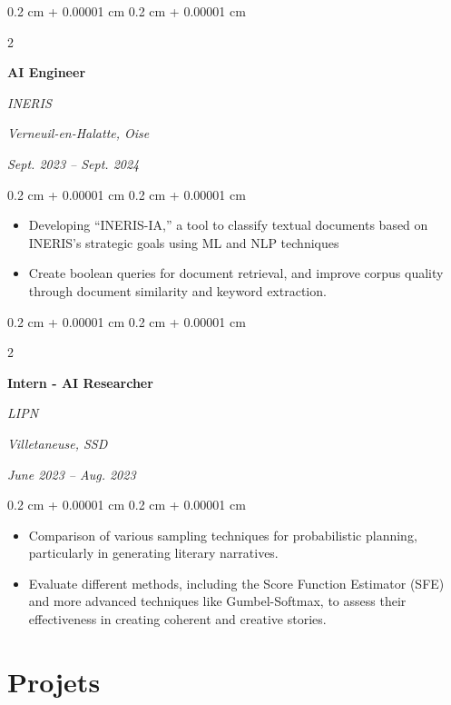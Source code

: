 \documentclass[10pt, letterpaper]{article}
\newenvironment{highlights}{
    \begin{itemize}[
        topsep=0.10 cm,
        parsep=0.10 cm,
        partopsep=0pt,
        itemsep=0pt,
        leftmargin=0.4 cm + 10pt
    ]
}{
    \end{itemize}
} %
\newenvironment{onecolentry}{
    \begin{adjustwidth}{
        0.2 cm + 0.00001 cm
    }{
        0.2 cm + 0.00001 cm
    }
}{
    \end{adjustwidth}
} %
\newenvironment{twocolentry}[2][]{
    \onecolentry
    \def\secondColumn{#2}
    \setcolumnwidth{\fill, 4.5 cm}
    \begin{paracol}{2}
}{
    \switchcolumn \raggedleft \secondColumn
    \end{paracol}
    \endonecolentry
} %
\begin{document}
        \begin{twocolentry}{
            \textit{Verneuil-en-Halatte, Oise}    
                
            \textit{Sept. 2023 – Sept. 2024}}
                \textbf{AI Engineer}
                
                \textit{INERIS}
        \end{twocolentry} 
        \vspace{0.10 cm}
        \begin{onecolentry}
            \begin{highlights}
                \item Developing “INERIS-IA,” a tool to classify textual documents based on INERIS’s strategic goals using ML and NLP techniques
                \item Create boolean queries for document retrieval, and improve corpus quality through document similarity and keyword extraction.
            \end{highlights}
        \end{onecolentry}
        \vspace{0.2 cm}


        \begin{twocolentry}{
            \textit{Villetaneuse, SSD}    
                
            \textit{June 2023 – Aug. 2023}}
                \textbf{Intern - AI Researcher}
                
                \textit{LIPN}
        \end{twocolentry}    
        \vspace{0.10 cm}
        \begin{onecolentry}
            \begin{highlights}
                \item Comparison of various sampling techniques for probabilistic planning, particularly in generating literary narratives.
                \item Evaluate different methods, including the Score Function Estimator (SFE) and more advanced techniques like Gumbel-Softmax, to assess their effectiveness in creating coherent and creative stories.
            \end{highlights}
        \end{onecolentry}

        \section{Projets}
\end{document}
